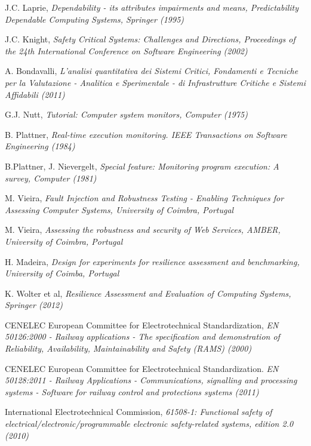 \begin{thebibliography}{9}
J.C. Laprie, \textit{Dependability - its attributes impairments and means, Predictability Dependable Computing Systems, Springer (1995)}

J.C. Knight, \textit{Safety Critical Systems: Challenges and Directions, Proceedings of the 24th International Conference on Software Engineering (2002)}

A. Bondavalli, \textit{L'analisi quantitativa dei Sistemi Critici, Fondamenti e Tecniche per la Valutazione - Analitica e Sperimentale - di Infrastrutture Critiche e Sistemi Affidabili (2011)}

G.J. Nutt, \textit{Tutorial: Computer system monitors, Computer (1975)}

B. Plattner, \textit{Real-time execution monitoring. IEEE Transactions on Software Engineering (1984)}

B.Plattner, J. Nievergelt, \textit{Special feature: Monitoring program execution: A survey, Computer (1981)}

M. Vieira, \emph{Fault Injection and
Robustness Testing - Enabling
Techniques for Assessing
Computer Systems, University
of Coimbra, Portugal}

M. Vieira, \emph{Assessing the
	robustness and security of Web
	Services, AMBER, University of
	Coimbra, Portugal}

H. Madeira, \emph{Design for experiments for resilience assessment and benchmarking, University of Coimba, Portugal}

K. Wolter et al,
\textit{Resilience Assessment and Evaluation of Computing Systems, Springer (2012)}

CENELEC European Committee for Electrotechnical Standardization, \textit{EN 50126:2000 - Railway applications - The specification and demonstration of Reliability, Availability, Maintainability and Safety (RAMS) (2000)}

CENELEC European Committee for Electrotechnical Standardization. \textit{EN 50128:2011 - Railway Applications - Communications, signalling and processing systems - Software for railway control and protections systems (2011)}

International Electrotechnical Commission, \textit{61508-1: Functional safety of electrical/electronic/programmable electronic safety-related systems, edition 2.0 (2010)}



\end{thebibliography}
